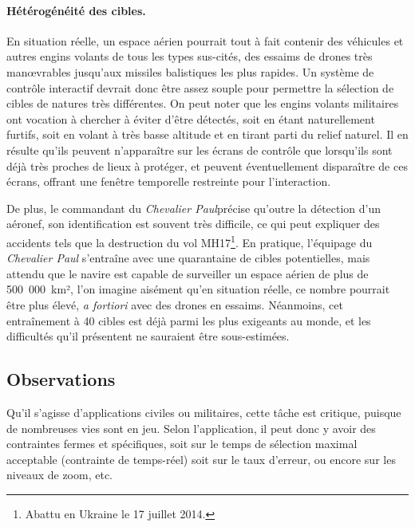 	\paragraph{Hétérogénéité des cibles.}
	En situation réelle, un espace aérien pourrait tout à fait contenir des véhicules et autres engins volants de tous les types sus-cités, des essaims de drones très manœvrables jusqu'aux missiles balistiques les plus rapides. Un système de contrôle interactif devrait donc être assez souple pour permettre la sélection de cibles de natures très différentes.
	On peut noter que les engins volants militaires ont vocation à chercher à éviter d'être détectés, soit en étant naturellement furtifs, soit en volant à très basse altitude et en tirant parti du relief naturel. Il en résulte qu'ils peuvent n'apparaître sur les écrans de contrôle que lorsqu'ils sont déjà très proches de lieux à protéger, et peuvent éventuellement disparaître de ces écrans, offrant une fenêtre temporelle restreinte pour l'interaction.
	
	De plus, le commandant du \emph{Chevalier Paul}\footnotemark précise qu'outre la détection d'un aéronef, son identification est souvent très difficile, ce qui peut expliquer des accidents tels que la destruction du vol MH17\footnote{Abattu en Ukraine le 17 juillet 2014.}. En pratique, l'équipage du \emph{Chevalier Paul} s'entraîne avec une quarantaine de cibles potentielles, mais attendu que le navire est capable de surveiller un espace aérien de plus de 500~000~km², l'on imagine aisément qu'en situation réelle, ce nombre pourrait être plus élevé, \emph{a fortiori} avec des drones en essaims. Néanmoins, cet entraînement à 40 cibles est déjà parmi les plus exigeants au monde, et les difficultés qu'il présentent ne sauraient être sous-estimées.
	
	
	
	
	
	
	\subsection{Observations}
	Qu'il s'agisse d'applications civiles ou militaires, cette tâche est critique, puisque de nombreuses vies sont en jeu. Selon l'application, il peut donc y avoir des contraintes fermes et spécifiques, soit sur le temps de sélection maximal acceptable (contrainte de temps-réel) soit sur le taux d'erreur, ou encore sur les niveaux de zoom, etc.

